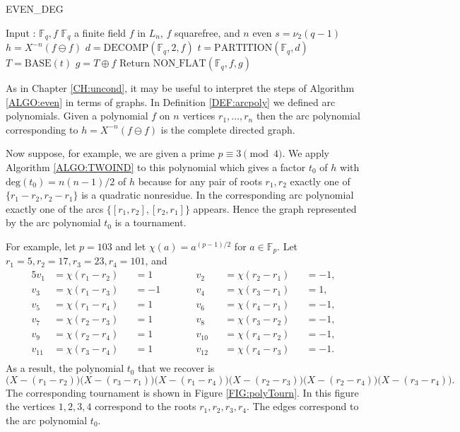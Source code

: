 \documentclass{article}
\theoremstyle{plain}
\theoremstyle{definition}
\def\Fp {{ \mathbb{F} _ {p} }}
\def\Fq {{ \mathbb{F} _ {q} }}
\def\deg {{ \mathrm{deg}}}
\begin{document}
		\begin{singlespace}
    \begin{algorithm}[H]
		\DontPrintSemicolon
		\label{ALGO:even}	
		\caption{EVEN\_DEG}
		    Input : $\Fq,f$ \;
				\hspace{2mm} $\Fq$ a finite field \;
				\hspace{2mm} $f$ in $L_n$, $f$ squarefree, and $n$ even \;
        $s = \nu_2(q-1)$ \;
        $h = X^{-n}(f \ominus f)$ \;  
        $d = \textrm{DECOMP}(\Fq,2,f)$ \;
				$t = \textrm{PARTITION}(\Fq,d)$ \;
        $T = \textrm{BASE}(t)$ \;
        $g = T \oplus f$ \;
        Return $\textrm{NON\_FLAT}(\Fq,f,g)$ \;
    \end{algorithm}
		\end{singlespace}		
		\vspace{5mm}		
		
		As in Chapter \ref{CH:uncond}, it may be useful to interpret the steps of Algorithm \ref{ALGO:even} in terms of graphs. In Definition \ref{DEF:arcpoly} we defined arc polynomials. Given a polynomial $f$ on $n$ vertices $r_1,\ldots,r_n$ then the arc polynomial corresponding to $h=X^{-n}(f \ominus f)$ is the complete directed graph. 
		
		Now suppose, for example, we are given a prime $p \equiv 3 \pmod 4$. We apply Algorithm \ref{ALGO:TWOIND} to this polynomial which gives a factor $t_0$ of $h$ with $\deg(t_0)=n(n-1)/2$ of $h$ because for any pair of roots $r_1,r_2$ exactly one of $\{ r_1-r_2, r_2-r_1 \}$ is a quadratic nonresidue. In the corresponding arc polynomial exactly one of the arcs $\{ [r_1,r_2], [r_2,r_1] \}$ appears. Hence the graph represented by the arc polynomial $t_0$ is a tournament.
		
		For example, let $p=103$ and let $\chi(a)=a^{(p-1)/2}$ for $a \in \Fp$. Let $r_1 = 5, r_2 = 17, r_3 = 23, r_4 = 101$, and
		\begin{alignat*}{5}
		v_1    &= \chi(r_1-r_2) &&=1  \quad\quad && v_2    &&= \chi(r_2-r_1)  &&=-1, \\
    v_3    &= \chi(r_1-r_3) &&=-1 \quad\quad && v_4    &&= \chi(r_3-r_1)  &&=1,  \\
    v_5    &= \chi(r_1-r_4) &&=1  \quad\quad && v_6    &&= \chi(r_4-r_1)  &&=-1, \\
    v_7    &= \chi(r_2-r_3) &&=1  \quad\quad && v_8    &&= \chi(r_3-r_2)  &&=-1, \\
    v_9    &= \chi(r_2-r_4) &&=1  \quad\quad && v_{10} &&= \chi(r_4-r_2)  &&=-1, \\
    v_{11} &= \chi(r_3-r_4) &&=1  \quad\quad && v_{12} &&= \chi(r_4-r_3)  &&=-1. \\
		\end{alignat*}
		As a result, the polynomial $t_0$ that we recover is 
		\[ \bigl(X-(r_1-r_2) \bigr)\bigl(X-(r_3-r_1)\bigr)\bigl(X-(r_1-r_4)\bigr)\bigl(X-(r_2-r_3)\bigr)\bigl(X-(r_2-r_4)\bigr)\bigl(X-(r_3-r_4)\bigr).\]
		The corresponding tournament is shown in Figure \ref{FIG:polyTourn}. In this figure the vertices $1,2,3,4$ correspond to the roots $r_1,r_2,r_3,r_4$. The edges correspond to the arc polynomial $t_0$.
		
\end{document}
